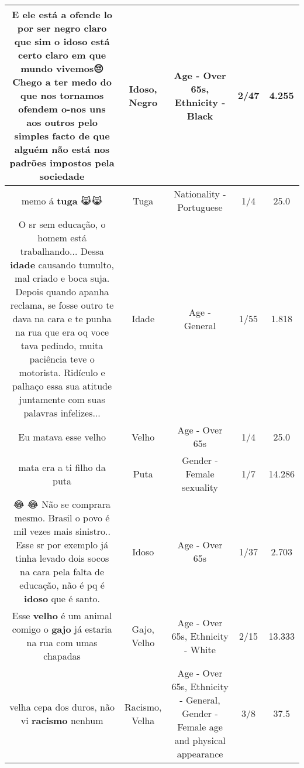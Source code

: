 \documentclass[11pt]{article}
\newlength\mylength
\begin{document}
\begin{center}
\begin{longtable}{|C{.65\mylength}|C{.30\mylength}|C{.12\mylength}|C{.12\mylength}|C{.12\mylength}|}
  \small E ele está a ofende lo por ser \textbf{negro} claro que sim o \textbf{idoso} está certo claro em que mundo vivemos😔Chego a ter medo do que nos tornamos ofendem o-nos uns aos outros pelo simples facto de que alguém não está nos padrões impostos pela sociedade\normalsize   & Idoso, Negro & Age - Over 65s, Ethnicity - Black & 2/47 & 4.255 \\  \hline
  \small memo á \textbf{tuga} 😹😹\normalsize   & Tuga & Nationality - Portuguese & 1/4 & 25.0 \\  \hline
  \small O sr sem educação, o homem está trabalhando... Dessa \textbf{idade} causando tumulto, mal criado e boca suja. Depois quando apanha reclama, se fosse outro te dava na cara e te punha na rua que era oq voce tava pedindo, muita paciência teve o motorista. Ridículo e palhaço essa sua atitude juntamente com suas palavras infelizes...\normalsize   & Idade & Age - General & 1/55 & 1.818 \\  \hline
  \small Eu matava esse velho\normalsize   & Velho & Age - Over 65s & 1/4 & 25.0 \\  \hline
  \small mata era a ti filho da puta\normalsize   & Puta & Gender - Female sexuality & 1/7 & 14.286 \\  \hline
  \small 😂 😂 Não se comprara mesmo. Brasil o povo é mil vezes mais sinistro.. Esse sr por exemplo já tinha levado dois socos na cara pela falta de educação, não é pq é \textbf{idoso} que é santo.\normalsize   & Idoso & Age - Over 65s & 1/37 & 2.703 \\  \hline
  \small Esse \textbf{velho} é um animal comigo o \textbf{gajo} já estaria na rua com umas chapadas\normalsize   & Gajo, Velho & Age - Over 65s, Ethnicity - White & 2/15 & 13.333 \\  \hline
  \small velha cepa dos duros, não vi \textbf{racismo} nenhum\normalsize   & Racismo, Velha & Age - Over 65s, Ethnicity - General, Gender - Female age and physical appearance & 3/8 & 37.5 \\  \hline

\end{longtable}
\end{center}
\end{document}
